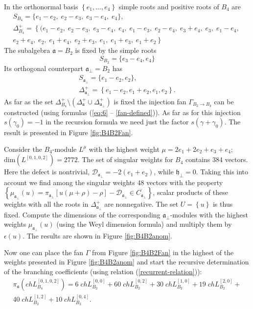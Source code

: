\documentclass[12pt]{iopart}
\theoremstyle{definition}
\newcommand{\af}{\mathfrak{a}}
\newcommand{\afb}{\mathfrak{a}_{\bot}}
\newcommand{\hf}{\mathfrak{h}}
\begin{document}
In the orthonormal basis $\left\{e_1,\dots,e_4\right\}$ simple roots and positive roots of $B_4$ are
\begin{eqnarray*}
  \label{eq:19}
  S_{B_4}= \{e_1 - e_2,\; e_2 - e_3,\; e_3 - e_4,\; e_4\},\\[2mm]
 \Delta^+_{B_4}=\left\{ (e_1 - e_2,\; e_2 - e_3,\; e_3 - e_4,\; e_4,\; e_1 - e_3,\; e_2 - e_4,\; e_3 + e_4,\; e_3,\; e_1 - e_4,\;\right.\\
 \left. e_2 + e_4,\; e_2,\; e_1 + e_4,\; e_2 + e_3,\; e_1,\; e_1 + e_3,\; e_1 + e_2\right\}
\end{eqnarray*}
The subalgebra $\af=B_2$ is fixed by the simple roots
\begin{equation*}
  \label{eq:26}
 S_{B_2}=\{e_3-e_4,e_4\}
\end{equation*}
Its orthogonal counterpart $\afb=B_2$ has
\begin{eqnarray*}
  \label{eq:27}
  S_{\afb}=\{e_1-e_2,e_2\},\\
 \Delta^{+}_{\afb}= \left\{e_1-e_2,e_1+e_2,e_1,e_2\right\}.
\end{eqnarray*}
As far as the set $\Delta^+_{B_4} \setminus \left(\Delta^{+}_{\af} \cup \Delta^{+}_{\afb}\right)$ is fixed the injection
fan $\Gamma_{B_2 \to B_4}$ can be constructed (using formulas (\ref{eq:6} -- \ref{fan-defined})).
As far as for this injection $s\left( \gamma_0\right)=-1$ in the recursion formula we need just the factor
 $s\left(\gamma + \gamma_0\right)$.
The result is presented in Figure \ref{fig:B4B2Fan}.


Consider the $B_4$-module $L^{\mu}$ with the highest weight $\mu=2e_1 + 2 e_2 + e_3 + e_4$; \,
$\mathrm{dim}(L^{\left[0,1,0,2\right]})=2772$.
The set of singular weights for $B_4$ contains 384 vectors.
Here the defect is nontrivial, $\mathcal{D}_{\af_{\perp }}=-2\left( e_1 + e_2 \right)$,
while $\hf_{\bot}=0$.
Taking this into account we find among the singular weights
48 vectors with the property $\left\{ \mu _{\af_{\perp }%
}\left( u\right) =\pi _{\af_{\perp }}\left[ u(\mu +\rho
)-\rho \right] -\mathcal{D}_{\af_{\perp }}\in \overline{C_{\af_{\perp }}}\right\} $,
scalar products of these weights with all the roots in $\Delta^{+}_{\afb}$ are nonnegative.
The set $U=\left\{ u \right\}$ is thus fixed.
Compute the dimensions of the corresponding $\afb$-modules with the highest weights
$ \mu _{\af_{\perp }}\left( u\right)$ (using the Weyl dimension formula) and multiply them
by $\epsilon\left( u \right)$. The results are shown in Figure \ref{fig:B4B2anom}.

Now one can place the fan $\Gamma$ from Figure \ref{fig:B4B2Fan} in the highest of the weights
presented in Figure \ref{fig:B4B2anom} and start the recursive determination of the branching coefficients
(using relation (\ref{recurrent-relation})):
\begin{eqnarray*}
  \label{eq:24}
  \pi_{\af} \left(ch L^{\left[0,1,0,2\right]}_{B_4}\right) = 6 \; ch L^{\left[0,0\right]}_{B_2}+ 60
  \; ch L_{B_2}^{\left[0,2\right]}+ 30 \; ch L_{B_2}^{\left[1,0\right]}+ 19 \; ch L_{B_2}^{\left[2,0\right]}+\\
  40 \; ch L_{B_2}^{\left[1,2\right]}+ 10 \; ch L_{B_2}^{\left[0,4\right]}.
\end{eqnarray*}
\end{document}
